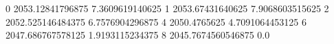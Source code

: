 0 2053.12841796875 7.3609619140625
1 2053.67431640625 7.9068603515625
2 2052.525146484375 6.7576904296875
4 2050.4765625 4.7091064453125
6 2047.686767578125 1.9193115234375
8 2045.7674560546875 0.0
